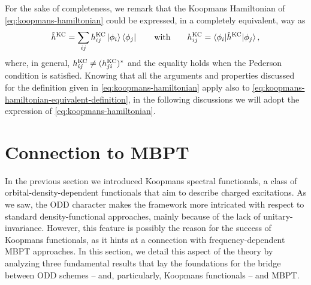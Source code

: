 For the sake of completeness, we remark that the Koopmans Hamiltonian of \cref{eq:koopmans-hamiltonian} could be expressed, in a completely equivalent, way as
%
\begin{equation}
    \hat{h}^{\rm KC} = \sum_{ij} h^{\rm KC}_{ij} \ket{\phi_i} \bra{\phi_j}
    \qquad \text{with} \qquad
    h^{\rm KC}_{ij} = \braket{\phi_i | \hat{h}^{\rm KC} | \phi_j} ,
    \label{eq:koopmans-hamiltonian-equivalent-definition}
\end{equation}
%
where, in general, $h^{\rm KC}_{ij} \neq (h^{\rm KC}_{ji})^*$ and the equality holds when the Pederson condition is satisfied. Knowing that all the arguments and properties discussed for the definition given in \eqref{eq:koopmans-hamiltonian} apply also to \cref{eq:koopmans-hamiltonian-equivalent-definition}, in the following discussions we will adopt the expression of \cref{eq:koopmans-hamiltonian}.


\section{Connection to MBPT\label{sec:koopmans-vs-mbpt}}
In the previous section we introduced Koopmans spectral functionals, a class of orbital-density-dependent functionals that aim to describe charged excitations. As we saw, the ODD character makes the framework more intricated with respect to standard density-functional approaches, mainly because of the lack of unitary-invariance. However, this feature is possibly the reason for the success of Koopmans functionals, as it hints at a connection with frequency-dependent MBPT approaches. In this section, we detail this aspect of the theory by analyzing three fundamental results that lay the foundations for the bridge between ODD schemes -- and, particularly, Koopmans functionals -- and MBPT.

